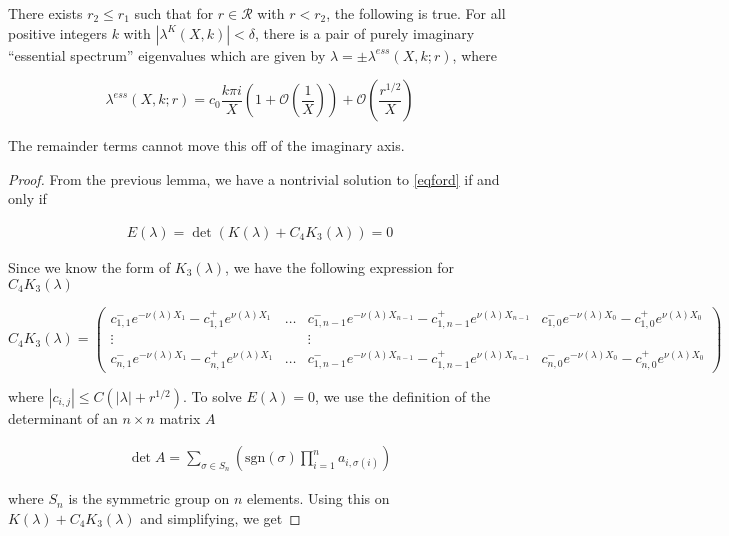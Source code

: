 \documentclass[thesis.tex]{subfiles}
\begin{document}
\begin{lemma}\label{essspeclemma}
There exists $r_2 \leq r_1$ such that for $r \in \mathcal{R}$ with $r < r_2$, the following is true. For all positive integers $k$ with $|\lambda^K(X,k)| < \delta$, there is a pair of purely imaginary ``essential spectrum'' eigenvalues which are given by $\lambda = \pm \lambda^{ess}(X,k; r)$, where

\begin{equation}\label{lambdaess}
\lambda^{ess}(X, k; r) = c_0 \frac{k \pi i }{X} \left( 1 + \mathcal{O}\left( \frac{1}{X} \right)\right) + \mathcal{O}\left( \frac{r^{1/2}}{X} \right)
\end{equation}

The remainder terms cannot move this off of the imaginary axis.

\begin{proof}
From the previous lemma, we have a nontrivial solution to \eqref{eqford} if and only if 

\begin{align*}
E(\lambda) = \det (K(\lambda) + C_4 K_3(\lambda)) = 0
\end{align*}

Since we know the form of $K_3(\lambda)$, we have the following expression for $C_4 K_3(\lambda)$

\[
C_4 K_3(\lambda) = 
\begin{pmatrix}
c_{1,1}^- e^{-\nu(\lambda)X_1} - c_{1,1}^+ e^{\nu(\lambda)X_1} 
& \dots & 
c_{1, n-1}^- e^{-\nu(\lambda)X_{n-1}} - c_{1,n-1}^+ e^{\nu(\lambda)X_{n-1}} &
c_{1,0}^- e^{-\nu(\lambda)X_0} - c_{1,0}^+ e^{\nu(\lambda)X_0}  \\
\vdots & & \vdots & \\
c_{n,1}^- e^{-\nu(\lambda)X_1} - c_{n,1}^+ e^{\nu(\lambda)X_1}
& \dots & 
c_{1, n-1}^- e^{-\nu(\lambda)X_{n-1}} - c_{1,n-1}^+ e^{\nu(\lambda)X_{n-1}} &
c_{n,0}^- e^{-\nu(\lambda)X_0} - c_{n,0}^+ e^{\nu(\lambda)X_0} 
\end{pmatrix}
\]

where $|c_{i,j}| \leq C(|\lambda| + r^{1/2})$. To solve $E(\lambda) = 0$, we use the definition of the determinant of an $n \times n$ matrix $A$

\begin{align*}
\det A = \sum_{\sigma \in S_n} \left( \text{sgn}(\sigma) \prod_{i=1}^n a_{i, \sigma(i)} \right)
\end{align*}

where $S_n$ is the symmetric group on $n$ elements. Using this on $K(\lambda) + C_4 K_3(\lambda)$ and simplifying, we get


\end{proof}
\end{lemma}
\end{document}
